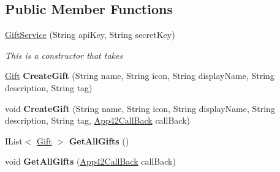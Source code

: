 \subsection*{Public Member Functions}
\begin{DoxyCompactItemize}
\item 
\hyperlink{classcom_1_1shephertz_1_1app42_1_1paas_1_1sdk_1_1csharp_1_1gift_1_1_gift_service_aebc426d6d72d1609f5c214c085345506}{Gift\+Service} (String api\+Key, String secret\+Key)
\begin{DoxyCompactList}\small\item\em This is a constructor that takes \end{DoxyCompactList}\item 
\hypertarget{classcom_1_1shephertz_1_1app42_1_1paas_1_1sdk_1_1csharp_1_1gift_1_1_gift_service_a0e6ba8a4bef8578275a04c26dc90b160}{\hyperlink{classcom_1_1shephertz_1_1app42_1_1paas_1_1sdk_1_1csharp_1_1gift_1_1_gift}{Gift} {\bfseries Create\+Gift} (String name, String icon, String display\+Name, String description, String tag)}\label{classcom_1_1shephertz_1_1app42_1_1paas_1_1sdk_1_1csharp_1_1gift_1_1_gift_service_a0e6ba8a4bef8578275a04c26dc90b160}

\item 
\hypertarget{classcom_1_1shephertz_1_1app42_1_1paas_1_1sdk_1_1csharp_1_1gift_1_1_gift_service_a086c7266b1b58ebc276b753fcf0bac50}{void {\bfseries Create\+Gift} (String name, String icon, String display\+Name, String description, String tag, \hyperlink{interfacecom_1_1shephertz_1_1app42_1_1paas_1_1sdk_1_1csharp_1_1_app42_call_back}{App42\+Call\+Back} call\+Back)}\label{classcom_1_1shephertz_1_1app42_1_1paas_1_1sdk_1_1csharp_1_1gift_1_1_gift_service_a086c7266b1b58ebc276b753fcf0bac50}

\item 
\hypertarget{classcom_1_1shephertz_1_1app42_1_1paas_1_1sdk_1_1csharp_1_1gift_1_1_gift_service_aae111154566e899da6d54aac6a93e9b4}{I\+List$<$ \hyperlink{classcom_1_1shephertz_1_1app42_1_1paas_1_1sdk_1_1csharp_1_1gift_1_1_gift}{Gift} $>$ {\bfseries Get\+All\+Gifts} ()}\label{classcom_1_1shephertz_1_1app42_1_1paas_1_1sdk_1_1csharp_1_1gift_1_1_gift_service_aae111154566e899da6d54aac6a93e9b4}

\item 
\hypertarget{classcom_1_1shephertz_1_1app42_1_1paas_1_1sdk_1_1csharp_1_1gift_1_1_gift_service_aae17528e16c86ceffb7ccbf3fc4636fe}{void {\bfseries Get\+All\+Gifts} (\hyperlink{interfacecom_1_1shephertz_1_1app42_1_1paas_1_1sdk_1_1csharp_1_1_app42_call_back}{App42\+Call\+Back} call\+Back)}\label{classcom_1_1shephertz_1_1app42_1_1paas_1_1sdk_1_1csharp_1_1gift_1_1_gift_service_aae17528e16c86ceffb7ccbf3fc4636fe}


\end{DoxyCompactItemize}
